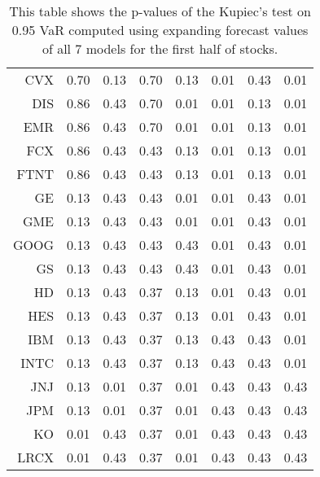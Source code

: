 \begin{table}[ht]
\begin{tabular}{rrrrrrrr}
  CVX & 0.70 & 0.13 & 0.70 & 0.13 & 0.01 & 0.43 & 0.01 \\ 
  DIS & 0.86 & 0.43 & 0.70 & 0.01 & 0.01 & 0.13 & 0.01 \\ 
  EMR & 0.86 & 0.43 & 0.70 & 0.01 & 0.01 & 0.13 & 0.01 \\ 
  FCX & 0.86 & 0.43 & 0.43 & 0.13 & 0.01 & 0.13 & 0.01 \\ 
  FTNT & 0.86 & 0.43 & 0.43 & 0.13 & 0.01 & 0.13 & 0.01 \\ 
  GE & 0.13 & 0.43 & 0.43 & 0.01 & 0.01 & 0.43 & 0.01 \\ 
  GME & 0.13 & 0.43 & 0.43 & 0.01 & 0.01 & 0.43 & 0.01 \\ 
  GOOG & 0.13 & 0.43 & 0.43 & 0.43 & 0.01 & 0.43 & 0.01 \\ 
  GS & 0.13 & 0.43 & 0.43 & 0.43 & 0.01 & 0.43 & 0.01 \\ 
  HD & 0.13 & 0.43 & 0.37 & 0.13 & 0.01 & 0.43 & 0.01 \\ 
  HES & 0.13 & 0.43 & 0.37 & 0.13 & 0.01 & 0.43 & 0.01 \\ 
  IBM & 0.13 & 0.43 & 0.37 & 0.13 & 0.43 & 0.43 & 0.01 \\ 
  INTC & 0.13 & 0.43 & 0.37 & 0.13 & 0.43 & 0.43 & 0.01 \\ 
  JNJ & 0.13 & 0.01 & 0.37 & 0.01 & 0.43 & 0.43 & 0.43 \\ 
  JPM & 0.13 & 0.01 & 0.37 & 0.01 & 0.43 & 0.43 & 0.43 \\ 
  KO & 0.01 & 0.43 & 0.37 & 0.01 & 0.43 & 0.43 & 0.43 \\ 
  LRCX & 0.01 & 0.43 & 0.37 & 0.01 & 0.43 & 0.43 & 0.43 \\ 
   \hline
\end{tabular}
\caption[Kupiec's test p-values, alpha =0.95 (1)]{This table shows the p-values of the Kupiec's test on 0.95 VaR computed using expanding forecast values of all 7 models for the first half of stocks.} 
\label{Table:Kupiec_test_expanding_0.95_1}
\end{table}
